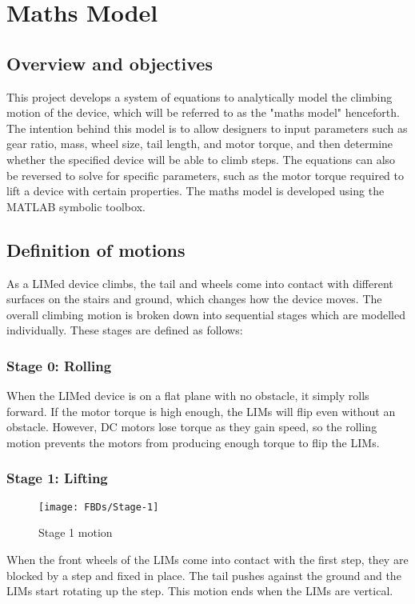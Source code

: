 \chapter{Maths Model}

\section{Overview and objectives}

This project develops a system of equations to analytically model the climbing motion of the device, which will be referred to as the "maths model" henceforth. The intention behind this model is to allow designers to input parameters such as gear ratio, mass, wheel size, tail length, and motor torque, and then determine whether the specified device will be able to climb steps. The equations can also be reversed to solve for specific parameters, such as the motor torque required to lift a device with certain properties. The maths model is developed using the MATLAB symbolic toolbox.\\

\section{Definition of motions}

As a LIMed device climbs, the tail and wheels come into contact with different surfaces on the stairs and ground, which changes how the device moves. The overall climbing motion is broken down into sequential stages which are modelled individually. These stages are defined as follows:\\
\subsection*{Stage 0: Rolling}

When the LIMed device is on a flat plane with no obstacle, it simply rolls forward. If the motor torque is high enough, the LIMs will flip even without an obstacle. However, DC motors lose torque as they gain speed, so the rolling motion prevents the motors from producing enough torque to flip the LIMs.\\


\subsection*{Stage 1: Lifting}
\begin{wrapfigure}{r}{0.35\textwidth} %
	\centering
	\texttt{[image: FBDs/Stage-1]}
	\caption{Stage 1 motion}
	\label{fig:stage1}
\end{wrapfigure}
When the front wheels of the LIMs come into contact with the first step, they are blocked by a step and fixed in place. The tail pushes against the ground and the LIMs start rotating up the step. This motion ends when the LIMs are vertical.
\\

